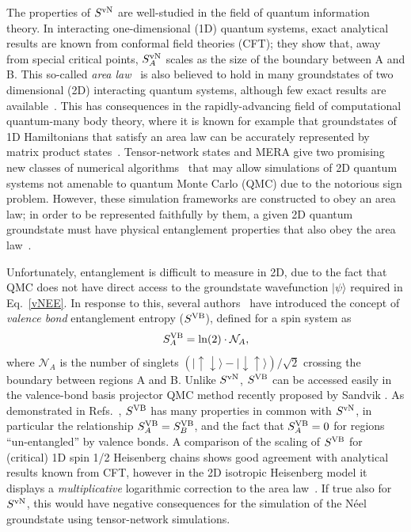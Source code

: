 \documentclass[prl,aps,twocolumn,floatfix,amsmath,amssymb,superscriptaddress,tightenlines]{revtex4}
\begin{document}
The properties of $S^{ \rm vN}$ are well-studied in the field of quantum information theory.
In interacting one-dimensional (1D) quantum systems, exact analytical results are known from conformal
field theories (CFT); they show that, away from special critical points,
$S^{ \rm vN}_A$ scales as the size of the boundary between A and B.
This so-called {\it area law}~\cite{Shredder} is also believed to hold in many
groundstates of two dimensional (2D) interacting quantum systems,
although few exact results are available~\cite{ALreview}.  This has 
consequences in the
rapidly-advancing field of computational quantum-many body theory, where
it is known for example that groundstates of 1D Hamiltonians that satisfy an area law
can be accurately represented by matrix product states~\cite{MPS_DMRG}.
Tensor-network states and MERA give two promising new classes of numerical
algorithms~\cite{PEPS1} 
that may allow simulations of 2D quantum systems not amenable to quantum Monte Carlo (QMC) due to
the notorious sign problem.  However, 
these simulation frameworks
are constructed to obey an area law; in order to be represented faithfully
by them, a given 2D quantum groundstate must have physical entanglement
properties that also obey the area law~\cite{ALreview}.


Unfortunately, entanglement is %
difficult to 
measure in 2D, due to the fact that QMC 
does not have
direct access to the groundstate wavefunction $| \psi \rangle$ required
in Eq.~\eqref{vNEE}.  In response to this, several authors~\cite{Alet,
Chh} have introduced the concept of {\it valence bond}
entanglement entropy ($S^{\rm VB}$), defined for a  spin system as
\begin{equation} 
S^{\rm VB}_A = \ln(2) \cdot \mathcal{N}_A, \label{VBEE}
\end{equation} 
where $ \mathcal{N}_A$ is the number of singlets
${( |\uparrow \downarrow \rangle - | \downarrow \uparrow
\rangle)/\sqrt{2}}$ crossing the boundary between regions A and B.  Unlike
$S^{ \rm vN}$, $S^{\rm VB}$ can be accessed easily in the valence-bond basis
projector QMC method recently proposed by Sandvik \cite{Sandvik}.  As
demonstrated in Refs.~\cite{Alet,Chh}, $S^{\rm VB}$ has many properties in
common with $S^{ \rm vN}$, in particular the relationship $S^{\rm VB}_A = S^{\rm VB}_B$, and the
fact that $S^{\rm VB}_A=0$ for regions ``un-entangled'' by valence bonds.
A comparison of the scaling of $S^{\rm VB}$ for (critical) 1D spin
1/2 Heisenberg chains shows good agreement with analytical results known
from CFT, however in the
 2D isotropic Heisenberg model it
displays a {\it multiplicative} logarithmic correction to the area law~\cite{Alet,Chh}.  If
true also for $S^{ \rm vN}$, this would have negative consequences for the simulation of the 
N\'eel groundstate using tensor-network simulations.
\end{document}
